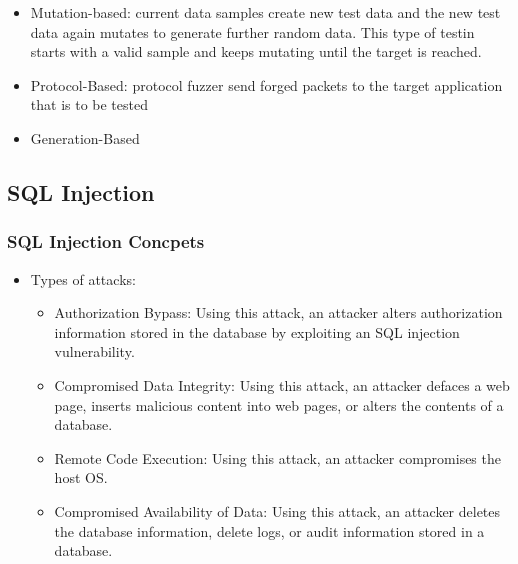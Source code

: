 \begin{itemize}
    \begin{itemize}
        \item Mutation-based: current data samples create new test data and the new test data again mutates to generate further random data. This type of testin starts with a valid sample and keeps mutating until the target is reached.
        \item Protocol-Based: protocol fuzzer send forged packets to the target application that is to be tested
        \item Generation-Based
    \end{itemize}
\end{itemize}

\subsection{SQL Injection}
\subsubsection{SQL Injection Concpets}
\begin{itemize}
    \item Types of attacks:
    \begin{itemize}
        \item Authorization Bypass: Using this attack, an attacker alters authorization information stored in the database by exploiting an SQL injection vulnerability.
        \item Compromised Data Integrity: Using this attack, an attacker defaces a web page, inserts malicious content into web pages, or alters the contents of a database.
        \item Remote Code Execution: Using this attack, an attacker compromises the host OS.
        \item Compromised Availability of Data: Using this attack, an attacker deletes the database information, delete logs, or audit information stored in a database.
    \end{itemize}
\end{itemize}

